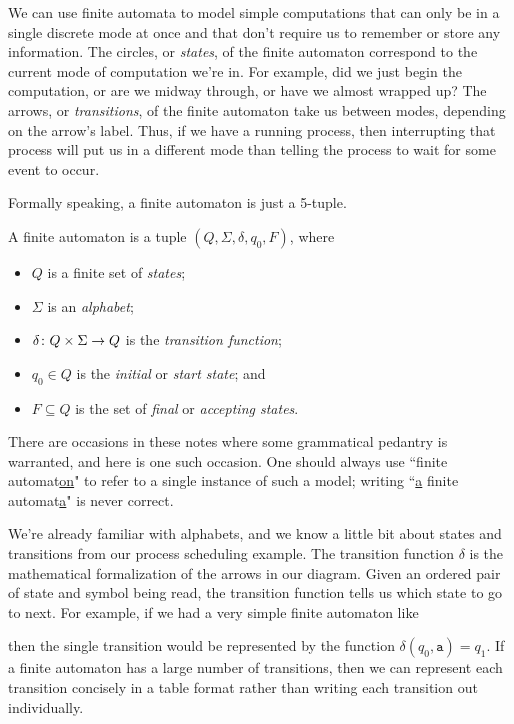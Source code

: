 We can use finite automata to model simple computations that can only be in a single discrete mode at once and that don't require us to remember or store any information. The circles, or \emph{states}, of the finite automaton correspond to the current mode of computation we're in. For example, did we just begin the computation, or are we midway through, or have we almost wrapped up? The arrows, or \emph{transitions}, of the finite automaton take us between modes, depending on the arrow's label. Thus, if we have a running process, then interrupting that process will put us in a different mode than telling the process to wait for some event to occur.

Formally speaking, a finite automaton is just a 5-tuple.

\begin{definition}
A finite automaton is a tuple $(Q, \Sigma, \delta, q_{0}, F)$, where
\begin{itemize}
\item $Q$ is a finite set of \emph{states};
\item $\Sigma$ is an \emph{alphabet};
\item $\delta \colon Q \times \Sigma \to Q$ is the \emph{transition function};
\item $q_{0} \in Q$ is the \emph{initial} or \emph{start state}; and
\item $F \subseteq Q$ is the set of \emph{final} or \emph{accepting states}.
\end{itemize}
\end{definition}

\begin{remark}
There are occasions in these notes where some grammatical pedantry is warranted, and here is one such occasion. One should always use ``finite automat\underline{on}" to refer to a single instance of such a model; writing ``\underline{a} finite automat\underline{a}" is never correct.
\end{remark}

We're already familiar with alphabets, and we know a little bit about states and transitions from our process scheduling example. The transition function $\delta$ is the mathematical formalization of the arrows in our diagram. Given an ordered pair of state and symbol being read, the transition function tells us which state to go to next. For example, if we had a very simple finite automaton like
\begin{center}
\end{center}
then the single transition would be represented by the function $\delta(q_{0}, \texttt{a}) = q_{1}$. If a finite automaton has a large number of transitions, then we can represent each transition concisely in a table format rather than writing each transition out individually.


